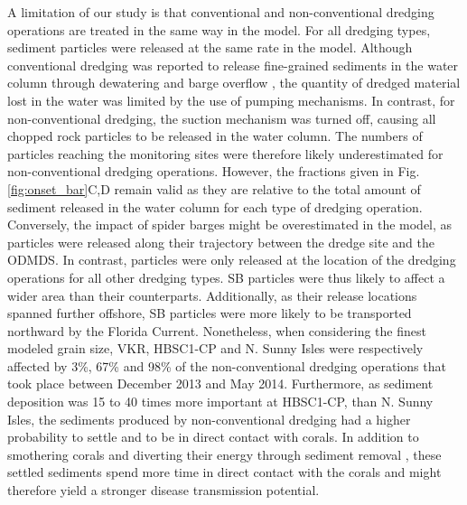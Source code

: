 \documentclass[preprint,12pt,authoryear]{elsarticle}
\begin{document}
A limitation of our study is that conventional and non-conventional dredging operations are treated in the same way in the model. For all dredging types, sediment particles were released at the same rate in the model. Although conventional dredging was reported to release fine-grained sediments in the water column through dewatering and barge overflow \citep{jones2016assessing}, the quantity of dredged material lost in the water was limited by the use of pumping mechanisms. In contrast, for non-conventional dredging, the suction mechanism was turned off, causing all chopped rock particles to be released in the water column. The numbers of particles reaching the monitoring sites were therefore likely underestimated for non-conventional dredging operations. However, the fractions given in Fig. \ref{fig:onset_bar}C,D remain valid as they are relative to the total amount of sediment released in the water column for each type of dredging operation. Conversely, the impact of spider barges might be overestimated in the model, as particles were released along their trajectory between the dredge site and the ODMDS. In contrast, particles were only released at the location of the dredging operations for all other dredging types. SB particles were thus likely to affect a wider area than their counterparts. Additionally, as their release locations spanned further offshore, SB particles were more likely to be transported northward by the Florida Current. Nonetheless, when considering the finest modeled grain size, VKR, HBSC1-CP and N. Sunny Isles were respectively affected by 3\%, 67\% and 98\% of the non-conventional dredging operations that took place between December 2013 and May 2014. Furthermore, as sediment deposition was 15 to 40 times more important at HBSC1-CP, than N. Sunny Isles, the sediments produced by non-conventional dredging had a higher probability to settle and to be in direct contact with corals. In addition to smothering corals and diverting their energy through sediment removal \citep{erftemeijer2012environmental}, these settled sediments spend more time in direct contact with the corals and might therefore yield a stronger disease transmission potential.
\end{document}
